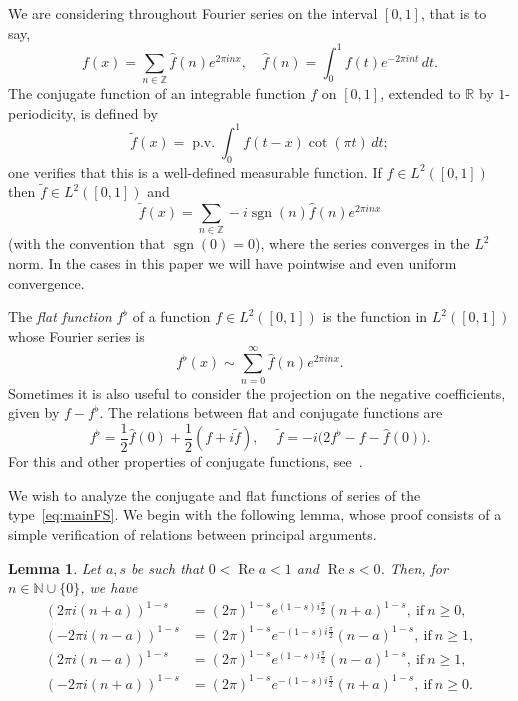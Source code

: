 \documentclass[11pt,a4paper,reqno]{amsart}
\newcommand{\N}{\mathbb{N}}
\newcommand{\R}{\mathbb{R}}
\newcommand{\Z}{\mathbb{Z}}
\let\hat\widehat
\let\tilde\widetilde
\renewcommand{\Re}{\operatorname{Re}}
\newcommand{\sgn}{\operatorname{sgn}}
\newcommand{\pv}{\operatorname{p.v.}}
\theoremstyle{plain}
\newtheorem{lemma}[theorem]{Lemma}
\theoremstyle{remark}
\numberwithin{equation}{section}
\begin{document}
We are considering throughout Fourier series on the interval $[0,1]$, that is to say,
\begin{equation*}
  f(x) = \sum_{n\in\Z} \hat{f}(n) e^{2\pi i n x},
  \quad
  \hat{f}(n) = \int_0^1 f(t) e^{-2\pi int}\,dt.
\end{equation*}
The conjugate function of an integrable function $f$ on $[0,1]$, extended to $\R$ by $1$-periodicity, is defined by
\begin{equation*}
  \tilde{f}(x) = \pv \int_{0}^1 f(t-x)\cot(\pi t)\,dt;
\end{equation*}
one verifies that this is a well-defined measurable function. If $f\in L^2([0,1])$ then $\tilde{f}\in L^2([0,1])$ and
\begin{equation*}
  \tilde{f}(x) = \sum_{n\in\Z} - i\sgn (n) \hat{f}(n)e^{2\pi i n x}
\end{equation*}
(with the convention that $\sgn(0)=0$),
where the series converges in the $L^2$ norm. In the cases in this paper we will have pointwise and even uniform convergence.

The \emph{flat function} $f^\flat$ of a function $f\in L^2([0,1])$ is the function in $L^2([0,1])$ whose Fourier series is
\begin{equation*}
  f^\flat(x) \sim \sum_{n=0}^\infty \hat{f}(n) e^{2\pi i nx}.
\end{equation*}
Sometimes it is also useful to consider the projection on the negative coefficients, given by $f-f^\flat$. The relations between flat and conjugate functions are
\begin{equation}
\label{eq:conjbemol}
  f^\flat = \frac12 \hat{f}(0) + \frac12(f+i\tilde{f}),\
  \quad
  \tilde{f} = -i \big(2f^\flat-f-\hat{f}(0)\big).
\end{equation}
For this and other properties of conjugate functions, see~\cite{Z}.

We wish to analyze the conjugate and flat functions of series of the type~\eqref{eq:mainFS}. We begin with the following lemma, whose proof consists of a simple verification of relations between principal arguments.

\begin{lemma}
Let $a,s$ be such that $0<\Re a<1$ and $\Re s<0$. Then, for $n\in\N\cup\{0\}$, we have
\begin{align*}
  (2\pi i(n+a))^{1-s} &= (2\pi)^{1-s}e^{(1-s)i\frac{\pi}{2}}(n+a)^{1-s},\ \text{if}\ n\geq 0, \\
  (-2\pi i(n-a))^{1-s} &= (2\pi)^{1-s}e^{-(1-s)i\frac{\pi}{2}}(n-a)^{1-s},\ \text{if}\ n\geq 1,  \\
  (2\pi i(n-a))^{1-s} &= (2\pi)^{1-s}e^{(1-s)i\frac{\pi}{2}}(n-a)^{1-s},\ \text{if}\ n\geq 1, \\
  (-2\pi i(n+a))^{1-s} &= (2\pi)^{1-s}e^{-(1-s)i\frac{\pi}{2}}(n+a)^{1-s},\ \text{if}\ n\geq 0.
\end{align*}
\end{lemma}
\end{document}
